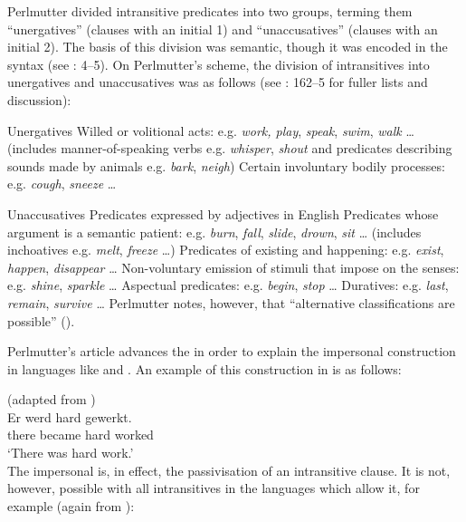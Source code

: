 \documentclass[output=paper]{langsci/langscibook}
\begin{document}
Perlmutter divided intransitive predicates into two groups, terming them
\enquote{unergatives} (clauses with an initial 1) and \enquote{unaccusatives}
(clauses with an initial 2). The basis of this division was semantic, though it
was encoded in the syntax (see \citealt{LevinRappaportHovav1995}: 4–5). On
Perlmutter’s scheme, the division of intransitives into unergatives and
unaccusatives was as follows (see \citealt{Perlmutter1978}: 162–5 for fuller
lists and discussion):

\ea\label{ex:19.19} Unergatives
    \ea Willed or volitional acts: e.g. \emph{work, play}, \emph{speak}, \emph{swim}, \emph{walk} \dots{} (includes manner-of-speaking verbs e.g. \emph{whisper}, \emph{shout} and predicates describing sounds made by animals e.g. \emph{bark}, \emph{neigh})
    \ex Certain involuntary bodily processes: e.g. \emph{cough}, \emph{sneeze} \dots{}
    \z
\z

\ea\label{ex:19.20} Unaccusatives
    \ea Predicates expressed by adjectives in English
    \ex Predicates whose argument is a semantic patient: e.g. \emph{burn}, \emph{fall}, \emph{slide}, \emph{drown}, \emph{sit} \dots{} (includes inchoatives e.g. \emph{melt}, \emph{freeze} \dots{})
    \ex Predicates of existing and happening: e.g. \emph{exist}, \emph{happen}, \emph{disappear} \dots{}
    \ex Non-voluntary emission of stimuli that impose on the senses: e.g. \emph{shine}, \emph{sparkle} \dots{}
    \ex Aspectual predicates: e.g. \emph{begin}, \emph{stop} \dots{}
    \ex Duratives: e.g. \emph{last}, \emph{remain}, \emph{survive}
    \dots{}\hfill\parencite[162--163]{Perlmutter1978}
    \z
\z
Perlmutter notes, however, that \enquote{alternative classifications are
possible} (\citeyear[163]{Perlmutter1978}).

Perlmutter’s article advances the  in order to explain
the impersonal  construction in languages like  and
. An
example of this construction in  is as follows:

\ea {} (adapted from \citealt[131]{Zaenen1993})\\
    \gll    Er   werd   hard   gewerkt.\\
            there   became   hard   worked\\
    \glt    \enquote*{There was hard work.}\\
\z
The impersonal  is, in effect, the passivisation of an intransitive
clause. It is not, however, possible with all intransitives in the languages
which allow it, for example (again from ):
\end{document}
